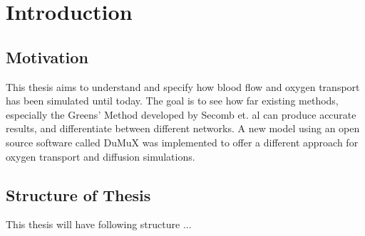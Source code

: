 \section{Introduction}
\label{s:Introduction}

\subsection{Motivation}

This thesis aims to understand and specify how blood flow and oxygen transport has been simulated until today. The goal is to see how far existing methods, especially the Greens' Method developed by Secomb et. al can produce accurate results, and differentiate between different networks. A new model using an open source software called DuMuX was implemented to offer a different approach for oxygen transport and diffusion simulations.

\subsection{Structure of Thesis}

This thesis will have following structure ...